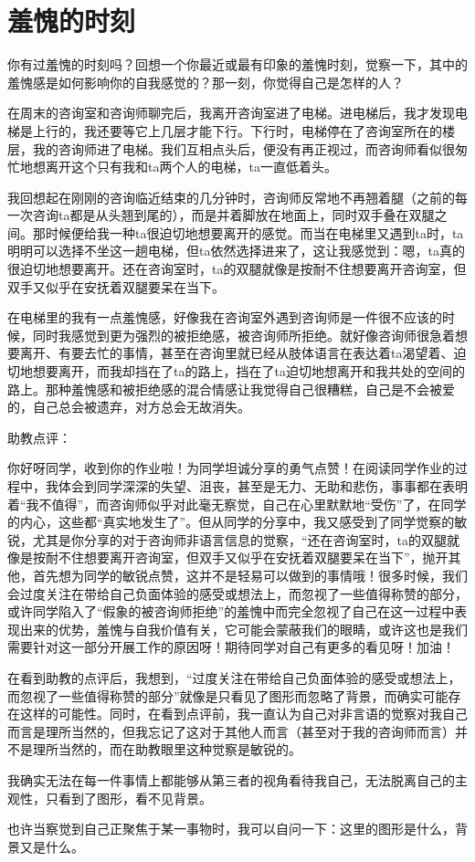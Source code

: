 \chapter{羞愧的时刻}






\noindent\textsf{你有过羞愧的时刻吗？回想一个你最近或最有印象的羞愧时刻，觉察一下，其中的羞愧感是如何影响你的自我感觉的？那一刻，你觉得自己是怎样的人？}

在周末的咨询室和咨询师聊完后，我离开咨询室进了电梯。进电梯后，我才发现电梯是上行的，我还要等它上几层才能下行。下行时，电梯停在了咨询室所在的楼层，我的咨询师进了电梯。我们互相点头后，便没有再正视过，而咨询师看似很匆忙地想离开这个只有我和ta两个人的电梯，ta一直低着头。

我回想起在刚刚的咨询临近结束的几分钟时，咨询师反常地不再翘着腿（之前的每一次咨询ta都是从头翘到尾的），而是并着脚放在地面上，同时双手叠在双腿之间。那时候便给我一种ta很迫切地想要离开的感觉。而当在电梯里又遇到ta时，ta明明可以选择不坐这一趟电梯，但ta依然选择进来了，这让我感觉到：嗯，ta真的很迫切地想要离开。还在咨询室时，ta的双腿就像是按耐不住想要离开咨询室，但双手又似乎在安抚着双腿\pozhehao{}要呆在当下。

在电梯里的我有一点羞愧感，好像我在咨询室外遇到咨询师是一件很不应该的时候，同时我感觉到更为强烈的被拒绝感，被咨询师所拒绝。就好像咨询师很急着想要离开、有要去忙的事情，甚至在咨询里就已经从肢体语言在表达着ta渴望着、迫切地想要离开，而我却挡在了ta的路上，挡在了ta迫切地想离开和我共处的空间的路上。那种羞愧感和被拒绝感的混合情感让我觉得自己很糟糕，自己是不会被爱的，自己总会被遗弃，对方总会无故消失。

\noindent\textsf{助教点评：}

你好呀同学，收到你的作业啦！为同学坦诚分享的勇气点赞！在阅读同学作业的过程中，我体会到同学深深的失望、沮丧，甚至是无力、无助和悲伤，事事都在表明着“我不值得”，而咨询师似乎对此毫无察觉，自己在心里默默地“受伤”了，在同学的内心，这些都“真实地发生了”。但从同学的分享中，我又感受到了同学觉察的敏锐，尤其是你分享的对于咨询师非语言信息的觉察，“还在咨询室时，ta的双腿就像是按耐不住想要离开咨询室，但双手又似乎在安抚着双腿\pozhehao{}要呆在当下”，抛开其他，首先想为同学的敏锐点赞，这并不是轻易可以做到的事情哦！很多时候，我们会过度关注在带给自己负面体验的感受或想法上，而忽视了一些值得称赞的部分，或许同学陷入了“假象的被咨询师拒绝”的羞愧中而完全忽视了自己在这一过程中表现出来的优势，羞愧与自我价值有关，它可能会蒙蔽我们的眼睛，或许这也是我们需要针对这一部分开展工作的原因呀！期待同学对自己有更多的看见呀！加油！

\tristarsepline

在看到助教的点评后，我想到，“过度关注在带给自己负面体验的感受或想法上，而忽视了一些值得称赞的部分”就像是只看见了图形而忽略了背景，而确实可能存在这样的可能性。同时，在看到点评前，我一直认为自己对非言语的觉察对我自己而言是理所当然的，但我忘记了这对于其他人而言（甚至对于我的咨询师而言）并不是理所当然的，而在助教眼里这种觉察是敏锐的。

我确实无法在每一件事情上都能够从第三者的视角看待我自己，无法脱离自己的主观性，只看到了图形，看不见背景。

也许当察觉到自己正聚焦于某一事物时，我可以自问一下：这里的图形是什么，背景又是什么。

